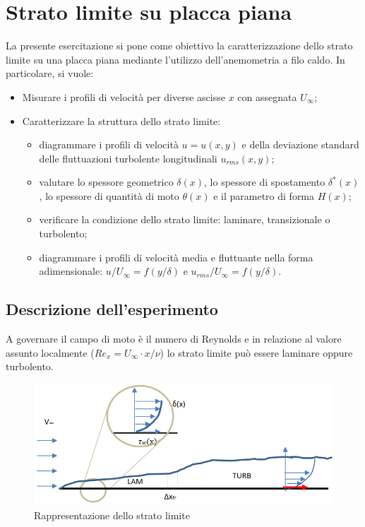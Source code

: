 \section{Strato limite su placca piana}\label{c9}
La presente esercitazione si pone come obiettivo la caratterizzazione dello strato limite su una placca piana mediante l'utilizzo dell'anemometria a filo caldo. In particolare, si vuole:
\begin{itemize}
    \item Misurare i profili di velocità per diverse ascisse $x$ con assegnata $U_\infty$;
    \item Caratterizzare la struttura dello strato limite:
    \begin{itemize}
        \item diagrammare i profili di velocità $u=u(x,y)$ e della deviazione standard delle fluttuazioni turbolente longitudinali $u_{rms}(x,y)$;
        \item valutare lo spessore geometrico $\delta(x)$, lo spessore di spostamento $\delta^*(x)$, lo spessore di quantità di moto $\theta(x)$ e il parametro di forma $H(x)$;
        \item verificare la condizione dello strato limite: laminare, transizionale o turbolento;
        \item diagrammare i profili di velocità media e fluttuante nella forma adimensionale: $u/U_\infty = f(y/\delta)$ e $u_{rms}/U_\infty = f(y/\delta)$.
    \end{itemize}
\end{itemize}

\subsection{Descrizione dell'esperimento}
A governare il campo di moto è il numero di Reynolds e in relazione al valore assunto localmente ($Re_{x}=U_\infty\cdot x/\nu$) lo strato limite può essere laminare oppure turbolento.
\begin{figure}[H]
    \centering
    \includegraphics[width=.8\textwidth]{images/9/slimage.png}
    \caption{Rappresentazione dello strato limite}
\end{figure}

